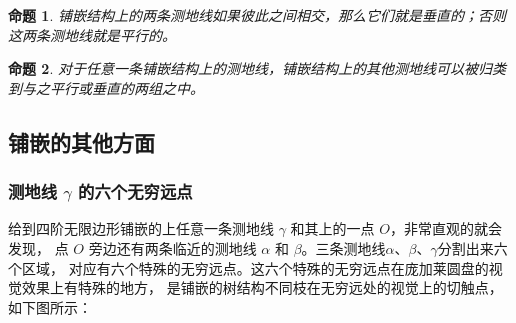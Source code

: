 \documentclass[a4paper,12pt]{article}
\newtheorem{proposition}{命题}
\begin{document}
\begin{proposition}
\label{A}
铺嵌结构上的两条测地线如果彼此之间相交，那么它们就是垂直的；否则这两条测地线就是平行的。
\end{proposition}

\begin{proposition}
\label{B}
对于任意一条铺嵌结构上的测地线，铺嵌结构上的其他测地线可以被归类到与之平行或垂直的两组之中。
\end{proposition}

\newpage

\subsection{铺嵌的其他方面}

\subsubsection{测地线 $\gamma$ 的六个无穷远点}

给到四阶无限边形铺嵌的上任意一条测地线 $\gamma$ 和其上的一点 $O$，非常直观的就会发现，
点 $O$ 旁边还有两条临近的测地线 $\alpha$ 和 $\beta$。三条测地线$\alpha$、$\beta$、$\gamma$分割出来六个区域，
对应有六个特殊的无穷远点。这六个特殊的无穷远点在庞加莱圆盘的视觉效果上有特殊的地方，
是铺嵌的树结构不同枝在无穷远处的视觉上的切触点，如下图所示：
\end{document}
